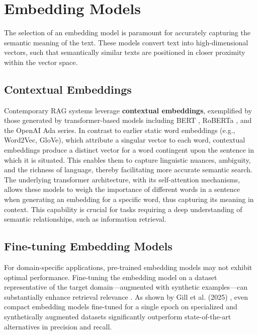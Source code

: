 \section{Embedding Models}
The selection of an embedding model is paramount for accurately capturing the semantic meaning of the text. These models convert text into high-dimensional vectors, such that semantically similar texts are positioned in closer proximity within the vector space.

\subsection{Contextual Embeddings}
Contemporary RAG systems leverage \textbf{contextual embeddings}, exemplified by those generated by transformer-based models including BERT \autocite{devlin2019bertpretrainingdeepbidirectional}, RoBERTa \autocite{liu2019robertarobustlyoptimizedbert}, and the OpenAI Ada series. In contrast to earlier static word embeddings (e.g., Word2Vec, GloVe), which attribute a singular vector to each word, contextual embeddings produce a distinct vector for a word contingent upon the sentence in which it is situated. This enables them to capture linguistic nuances, ambiguity, and the richness of language, thereby facilitating more accurate semantic search. The underlying transformer architecture, with its self-attention mechanisms, allows these models to weigh the importance of different words in a sentence when generating an embedding for a specific word, thus capturing its meaning in context. This capability is crucial for tasks requiring a deep understanding of semantic relationships, such as information retrieval.

\subsection{Fine-tuning Embedding Models}
For domain-specific applications, pre-trained embedding models may not exhibit optimal performance. Fine-tuning the embedding model on a dataset representative of the target domain—augmented with synthetic examples—can substantially enhance retrieval relevance \autocite{gill2025advancingsemanticcachingllms}. As shown by Gill et al. (2025) \autocite{gill2025advancingsemanticcachingllms}, even compact embedding models fine-tuned for a single epoch on specialized and synthetically augmented datasets significantly outperform state-of-the-art alternatives in precision and recall.

